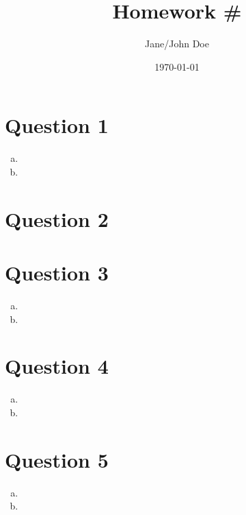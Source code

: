 \documentclass{article}
\title{Homework \#}
\author{Jane/John Doe}
\date{\today}
\begin{document}
\maketitle

\section*{Question 1}

\begin{enumerate}[(a)]
    \item \blindmathfalse \blindtext
    \item \blindmathtrue \Blindtext[4]
\end{enumerate}

\newpage

\section*{Question 2}

\blindmathpaper

\newpage

\section*{Question 3}

\begin{enumerate}[(a)]
    \item \blindmathfalse \blindtext
    \item \blindmathtrue \Blindtext[4]
\end{enumerate}

\newpage

\section*{Question 4}

\begin{enumerate}[(a)]
    \item \blindmathfalse \blindtext
    \item \blindmathtrue \Blindtext[4]
\end{enumerate}

\newpage

\section*{Question 5}

\begin{enumerate}[(a)]
    \item \blindmathfalse \blindtext
    \item \blindmathtrue \Blindtext[4]
\end{enumerate}
\end{document}
